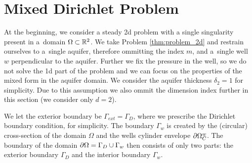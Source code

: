 \section{Mixed Dirichlet Problem}

At the beginning, we consider a steady 2d problem with a single singularity present in a~domain $\Omega\subset\mathbb{R}^2$.
We take Problem \ref{thm:problem_2d} and restrain ourselves to a~single aquifer, therefore ommitting the index $m$,
and a~single well $w$ perpendicular to the aquifer. Further we fix the pressure in the well,
so we do not solve the 1d part of the problem
and we can focus on the properties of the mixed form in the aquifer domain.
We consider the aquifer thickness $\delta_2=1$ for simplicity.
Due to this assumption we also ommit the dimension index further in this section (we consider only $d=2$).

We let the exterior boundary be  $\Gamma_{ext}=\Gamma_D$, where we prescribe the Dirichlet boundary condition, for simplicity.
The boundary $\Gamma_w$ is created by the (circular) cross-section of the domain $\Omega$
and the wells cylinder envelope $\partial\Omega^w_C$.
The boundary of the domain $\partial\Omega=\Gamma_D \cup \Gamma_w$ then consists of only two parts: the exterior boundary $\Gamma_D$
and the interior boundary $\Gamma_w$.


